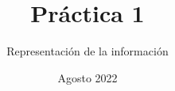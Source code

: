 
\setlength{\parindent}{0pt}

\title{Práctica 1}
\author{Representación de la información}
\date{Agosto 2022}



\maketitle



